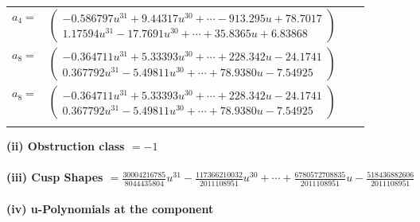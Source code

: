 \documentclass[1p]{elsarticle_modified}
\theoremstyle{definition}
\begin{document}
\begin{tabular}{m{7pt} m{180pt} m{7pt} m{180pt} }
\flushright $a_{4}=$&$\begin{pmatrix}-0.586797 u^{31}+9.44317 u^{30}+\cdots-913.295 u+78.7017\\1.17594 u^{31}-17.7691 u^{30}+\cdots+35.8365 u+6.83868\end{pmatrix}$ \\
\flushright $a_{8}=$&$\begin{pmatrix}-0.364711 u^{31}+5.33393 u^{30}+\cdots+228.342 u-24.1741\\0.367792 u^{31}-5.49811 u^{30}+\cdots+78.9380 u-7.54925\end{pmatrix}$\\ \flushright $a_{8}=$&$\begin{pmatrix}-0.364711 u^{31}+5.33393 u^{30}+\cdots+228.342 u-24.1741\\0.367792 u^{31}-5.49811 u^{30}+\cdots+78.9380 u-7.54925\end{pmatrix}$\\&\end{tabular}
\flushleft \textbf{(ii) Obstruction class $= -1$}\\~\\
\flushleft \textbf{(iii) Cusp Shapes $= \frac{30004216785}{8044435804} u^{31}-\frac{117366210032}{2011108951} u^{30}+\cdots+\frac{6780572708835}{2011108951} u-\frac{518436882606}{2011108951}$}\\~\\
\newpage\renewcommand{\arraystretch}{1}
\flushleft \textbf{(iv) u-Polynomials at the component}\newline \\
\end{document}
